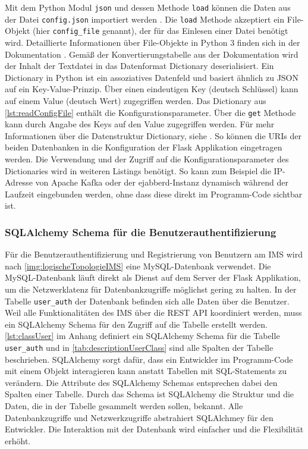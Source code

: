 \documentclass[a4paper,titlepage,halfparskip,12pt]{scrreprt}
\begin{document}
\begin{onehalfspacing}
Mit dem Python Modul \texttt{json} und dessen Methode \texttt{load} können die Daten aus der Datei \texttt{config.json} importiert werden \cite{pythonJSONapi}. Die \texttt{load} Methode akzeptiert ein File-Objekt (hier \texttt{config\_file} genannt), der für das Einlesen einer Datei benötigt wird. Detaillierte Informationen über File-Objekte in Python 3 finden sich in der Dokumentation \cite{usageFileDeskr}. Gemäß der Konvertierungstabelle aus der Dokumentation \cite{pythonJSONapi} wird der Inhalt der Textdatei in das Datenformat Dictionary deserialisiert. Ein Dictionary in Python ist ein assoziatives Datenfeld und basiert ähnlich zu \ac{JSON} auf ein Key-Value-Prinzip. Über einen eindeutigen Key (deutsch Schlüssel) kann auf einem Value (deutsch Wert) zugegriffen werden. Das Dictionary aus \autoref{lst:readConfigFile} enthält die Konfigurationsparameter. Über die \texttt{get} Methode kann durch Angabe des Keys auf den Value zugegriffen werden. Für mehr Informationen über die Datenstruktur Dictionary, siehe \cite{pythonDictionaries}. So können die \acs{URI}s der beiden Datenbanken in die Konfiguration der Flask Applikation eingetragen werden.  Die Verwendung und der Zugriff auf die Konfigurationsparameter des Dictionaries wird in weiteren Listings benötigt. So kann zum Beispiel die IP-Adresse von Apache Kafka oder der ejabberd-Instanz dynamisch während der Laufzeit eingebunden werden, ohne dass diese direkt im Programm-Code sichtbar ist.

\subsubsection*{SQLAlchemy Schema für die Benutzerauthentifizierung}

Für die Benutzerauthentifizierung und Registrierung von Benutzern am \acs{IMS} wird nach \autoref{img:logischeTopologieIMS} eine MySQL-Datenbank verwendet. Die MySQL-Datenbank läuft direkt als Dienst auf dem Server der Flask Applikation, um die Netzwerklatenz für Datenbankzugriffe möglichst gering zu halten. In der Tabelle \texttt{user\_auth} der Datenbank befinden sich alle Daten über die Benutzer. Weil alle Funktionalitäten des \acs{IMS} über die \acs{REST} \acs{API} koordiniert werden, muss ein SQLAlchemy Schema für den Zugriff auf die Tabelle erstellt werden. \autoref{lst:classUser} im Anhang definiert ein SQLAlchemy Schema für die Tabelle \texttt{user\_auth} und in \autoref{tab:descriptionUserClass} sind alle Spalten der Tabelle beschrieben. SQLAlchemy sorgt dafür, dass ein Entwickler im Programm-Code mit einem Objekt interagieren kann anstatt Tabellen mit SQL-Statements zu verändern. Die Attribute des SQLAlchemy Schemas entsprechen dabei den Spalten einer Tabelle. Durch das Schema ist SQLAlchemy die Struktur und die Daten, die in der Tabelle gesammelt werden sollen, bekannt. Alle Datenbankzugriffe und Netzwerkzugriffe abstrahiert SQLAlchmey für den Entwickler. Die Interaktion mit der Datenbank wird einfacher und die Flexibilität erhöht.


\end{onehalfspacing}
\end{document}
